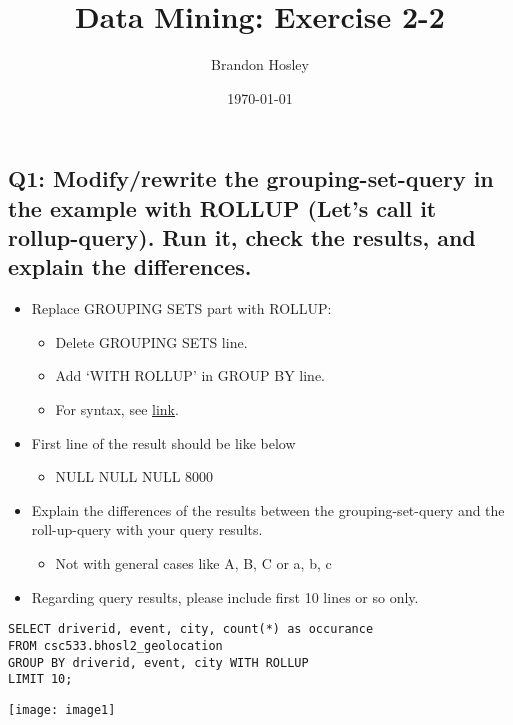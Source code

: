 \documentclass[]{article}
\title{Data Mining: Exercise 2-2}
\author{Brandon Hosley}
\date{\today}
\begin{document}
\maketitle


\subsection*{Q1: Modify/rewrite the grouping-set-query in the example with ROLLUP (Let’s call it rollup-query). Run it, check the results, and explain the differences.}

\begin{itemize}[before=\itshape,font=\normalfont]
	\item Replace GROUPING SETS part with ROLLUP:
	\begin{itemize}
		\setlength\itemsep{0em}
		\item Delete GROUPING SETS line.
		\item Add ‘WITH ROLLUP’ in GROUP BY line.
		\item For syntax, see \href{https://cwiki.apache.org/confluence/display/Hive/Enhanced+Aggregation\%2C+Cube\%2C+Grouping+and+Rollup}{link}.
	\end{itemize}
	\item First line of the result should be like below
	\begin{itemize}
		\item NULL NULL NULL 8000
	\end{itemize}
	\item Explain the differences of the results between the grouping-set-query and the roll-up-query with your query results. 
	\begin{itemize}
		\item Not with general cases like A, B, C or a, b, c 
	\end{itemize}
	\item Regarding query results, please include first 10 lines or so only.
\end{itemize}

\begin{verbatim}
SELECT driverid, event, city, count(*) as occurance
FROM csc533.bhosl2_geolocation
GROUP BY driverid, event, city WITH ROLLUP
LIMIT 10;
\end{verbatim}

\texttt{[image: image1]}
\end{document}
